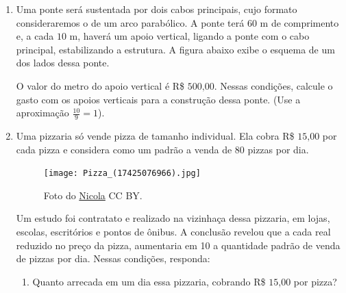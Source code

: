 \begin{enumerate}
\item Uma ponte será sustentada por dois cabos principais,  cujo formato consideraremos o de um arco parabólico. A ponte terá \(60\) m de comprimento e, a cada \(10\) m, haverá um apoio vertical, ligando a ponte com o cabo principal, estabilizando a estrutura. A figura abaixo exibe o esquema de um dos lados dessa ponte.
\begin{center}\end{center}
O valor do metro do apoio vertical é R\$ \(500\text{,}00\). Nessas condições, calcule o gasto com os apoios verticais para a construção dessa ponte. (Use a aproximação \(\frac{10}{9} = 1\)).

\item Uma pizzaria só vende pizza de tamanho individual. Ela cobra R\$ \(15\text{,}00\) por cada pizza e considera como um padrão a venda de \(80\) pizzas por dia.

\begin{figure}[H]
\centering
\capstart

\noindent\texttt{[image: Pizza\_(17425076966).jpg]}
\caption{Foto do \href{https://commons.wikimedia.org/wiki/File:Pizza\_(17425076966).jpg}{Nicola} CC BY.}\label{\detokenize{AF209-E:id4}}\end{figure}
\needspace{5em}
Um estudo foi contratato e realizado na vizinhaça dessa pizzaria, em lojas, escolas, escritórios e pontos de ônibus. A conclusão revelou que a cada real reduzido no preço da pizza, aumentaria em 10 a quantidade padrão de venda de pizzas por dia. Nessas condições, responda:
\begin{enumerate}
\item {} 
Quanto arrecada em um dia essa pizzaria, cobrando R\$ \(15\text{,}00\) por pizza?


\end{enumerate}
\end{enumerate}
